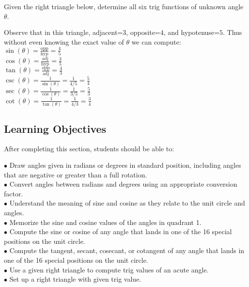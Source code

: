 \documentclass{ximera}
\begin{document}
\begin{question}
Given the right triangle below, determine all six trig functions of unknown angle $\theta$.

\begin{image}
 \end{image}
\begin{explanation}
Observe that in this triangle, adjacent=$3$, opposite=$4$, and hypotenuse=$5$. Thus without even knowing the exact value of $\theta$ we can compute:
\\$\sin(\theta)=\frac{\text{opp}}{\text{hyp}}=\frac{4}{5}$
\\$\cos(\theta)=\frac{\text{adj}}{\text{hyp}}=\frac{3}{5}$
\\$\tan(\theta)=\frac{\text{opp}}{\text{adj}}=\frac{4}{3}$
\\$\csc(\theta)=\frac{1}{\sin(\theta)}=\frac{1}{4/5}=\frac{5}{4}$
\\$\sec(\theta)=\frac{1}{\cos(\theta)}=\frac{1}{3/5}=\frac{5}{3}$
\\$\cot(\theta)=\frac{1}{\tan(\theta)}=\frac{1}{4/3}=\frac{3}{4}$
\end{explanation}
\end{question}


\subsection{Learning Objectives}
After completing this section, students should be able to:
\vspace{.05in}

\noindent$\bullet$ Draw angles given in radians or degrees in standard position, including angles that are negative or greater than a full rotation.
\\$\bullet$ Convert angles between radians and degrees using an appropriate conversion factor.
\\$\bullet$ Understand the meaning of sine and cosine as they relate to the unit circle and angles.
\\$\bullet$ Memorize the sine and cosine values of the angles in quadrant 1.
\\$\bullet$ Compute the sine or cosine of any angle that lands in one of the 16 special positions on the unit circle.
\\$\bullet$ Compute the tangent, secant, cosecant, or cotangent of any angle that lands in one of the 16 special positions on the unit circle.
\\$\bullet$ Use a given right triangle to compute trig values of an acute angle.
\\$\bullet$ Set up a right triangle with given trig value.
\end{document}
